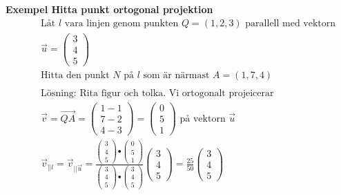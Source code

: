 \textbf{Exempel Hitta punkt ortogonal projektion} %
\begin{align*} 
  &\quad  \text{Låt $l$ vara linjen genom punkten $Q=(1,2,3)$ parallell med vektorn} \\
  &\quad  \vec{u} =
  \begin{pmatrix}  3 \\  4 \\  5  \end{pmatrix} \\
  &\quad  \text{Hitta den punkt $N$ på $l$ som är närmast } A=(1,7,4) \\
  &\quad  \\
  &\quad  \text{Lösning: Rita figur och tolka. Vi ortogonalt projeicerar} \\
  &\quad  \vec{v} = \overrightarrow{QA} =
  \begin{pmatrix}  1-1 \\  7-2 \\  4-3  \end{pmatrix} =
  \begin{pmatrix}  0 \\  5 \\ 1  \end{pmatrix} \text{ på vektorn }  \vec{u} \\
  &\quad \vec{v}_{||l} = \vec{v}_{||\vec{u}} = \frac{
    \begin{pmatrix} 3 \\ 4 \\ 5 \end{pmatrix} \bullet \begin{pmatrix} 0 \\ 5 \\ 1 \end{pmatrix}}{
    \begin{pmatrix} 3 \\ 4 \\ 5 \end{pmatrix} \bullet \begin{pmatrix} 3 \\ 4 \\ 5 \end{pmatrix}}
  \begin{pmatrix} 3 \\ 4 \\ 5 \end{pmatrix}
  = \frac{25}{50}\begin{pmatrix} 3 \\ 4 \\ 5 \end{pmatrix} \\

\end{align*}
